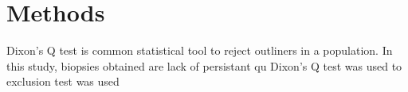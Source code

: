 \chapter{Methods}

Dixon's Q test is common statistical tool to reject outliners in a population. In this study, biopsies obtained are lack of persistant qu Dixon's Q test was used to   exclusion test was used 